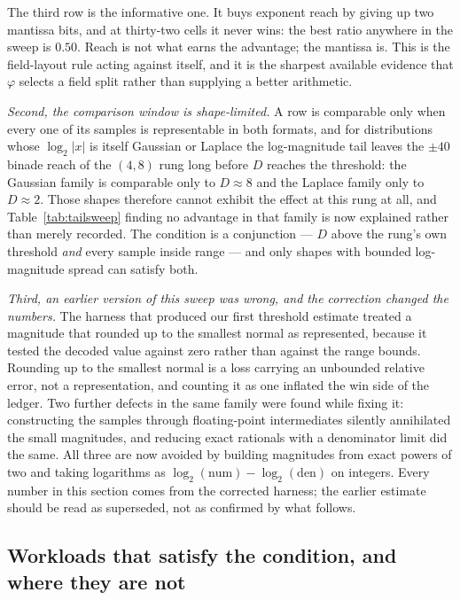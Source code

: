 \documentclass[11pt]{article}
\theoremstyle{definition}
\begin{document}
The third row is the informative one. It buys exponent reach by giving up two
mantissa bits, and at thirty-two cells it never wins: the best ratio anywhere in
the sweep is $0.50$. Reach is not what earns the advantage; the mantissa is. This
is the field-layout rule acting against itself, and it is the sharpest available
evidence that $\varphi$ selects a field split rather than supplying a better
arithmetic.

\emph{Second, the comparison window is shape-limited.} A row is comparable only
when every one of its samples is representable in both formats, and for
distributions whose $\log_2|x|$ is itself Gaussian or Laplace the log-magnitude
tail leaves the $\pm 40$ binade reach of the $(4,8)$ rung long before $D$ reaches
the threshold: the Gaussian family is comparable only to $D \approx 8$ and the
Laplace family only to $D \approx 2$. Those shapes therefore cannot exhibit the
effect at this rung at all, and Table~\ref{tab:tailsweep} finding no advantage in
that family is now explained rather than merely recorded. The condition is a
conjunction --- $D$ above the rung's own threshold \emph{and} every sample inside
range --- and only shapes with bounded log-magnitude spread can satisfy both.

\emph{Third, an earlier version of this sweep was wrong, and the correction
changed the numbers.} The harness that produced our first threshold estimate
treated a magnitude that rounded up to the smallest normal as represented, because
it tested the decoded value against zero rather than against the range bounds.
Rounding up to the smallest normal is a loss carrying an unbounded relative error,
not a representation, and counting it as one inflated the win side of the ledger.
Two further defects in the same family were found while fixing it: constructing
the samples through floating-point intermediates silently annihilated the small
magnitudes, and reducing exact rationals with a denominator limit did the same. All
three are now avoided by building magnitudes from exact powers of two and taking
logarithms as $\log_2(\text{num}) - \log_2(\text{den})$ on integers. Every number
in this section comes from the corrected harness; the earlier estimate should be
read as superseded, not as confirmed by what follows.

\subsection{Workloads that satisfy the condition, and where they are not}
\label{sec:nolanding}
\end{document}
